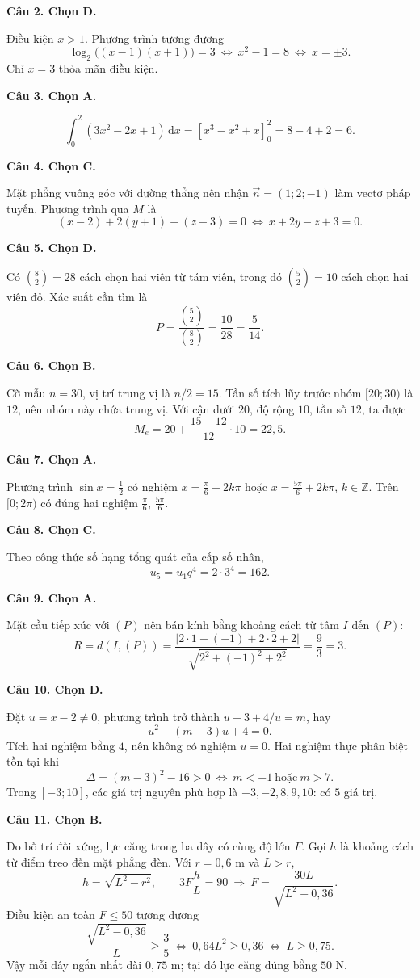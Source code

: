 \documentclass[12pt,a4paper]{article}
\newcommand{\loigiai}[1]{\par\medskip\Needspace{4\baselineskip}\noindent\textbf{#1}\par\nobreak}
\begin{document}
\loigiai{Câu 2. Chọn D.}
Điều kiện $x>1$. Phương trình tương đương
\[
\log_2\big((x-1)(x+1)\big)=3
\ \Longleftrightarrow\ x^2-1=8
\ \Longleftrightarrow\ x=\pm3.
\]
Chỉ $x=3$ thỏa mãn điều kiện.

\loigiai{Câu 3. Chọn A.}
\[
\int_0^2(3x^2-2x+1)\,\mathrm dx
=\left[x^3-x^2+x\right]_0^2=8-4+2=6.
\]

\loigiai{Câu 4. Chọn C.}
Mặt phẳng vuông góc với đường thẳng nên nhận $\vec n=(1;2;-1)$ làm vectơ pháp tuyến. Phương trình qua $M$ là
\[
(x-2)+2(y+1)-(z-3)=0
\ \Longleftrightarrow\ x+2y-z+3=0.
\]

\loigiai{Câu 5. Chọn D.}
Có $\binom82=28$ cách chọn hai viên từ tám viên, trong đó $\binom52=10$ cách chọn hai viên đỏ. Xác suất cần tìm là
\[
P=\frac{\binom52}{\binom82}=\frac{10}{28}=\frac5{14}.
\]

\loigiai{Câu 6. Chọn B.}
Cỡ mẫu $n=30$, vị trí trung vị là $n/2=15$. Tần số tích lũy trước nhóm $[20;30)$ là $12$, nên nhóm này chứa trung vị. Với cận dưới $20$, độ rộng $10$, tần số $12$, ta được
\[
M_e=20+\frac{15-12}{12}\cdot10=22{,}5.
\]

\loigiai{Câu 7. Chọn A.}
Phương trình $\sin x=\tfrac12$ có nghiệm $x=\tfrac\pi6+2k\pi$ hoặc $x=\tfrac{5\pi}6+2k\pi$, $k\in\mathbb Z$. Trên $[0;2\pi)$ có đúng hai nghiệm $\tfrac\pi6$, $\tfrac{5\pi}6$.

\loigiai{Câu 8. Chọn C.}
Theo công thức số hạng tổng quát của cấp số nhân,
\[
u_5=u_1q^4=2\cdot3^4=162.
\]

\loigiai{Câu 9. Chọn A.}
Mặt cầu tiếp xúc với $(P)$ nên bán kính bằng khoảng cách từ tâm $I$ đến $(P)$:
\[
R=d(I,(P))=\frac{|2\cdot1-(-1)+2\cdot2+2|}{\sqrt{2^2+(-1)^2+2^2}}=\frac93=3.
\]

\loigiai{Câu 10. Chọn D.}
Đặt $u=x-2\ne0$, phương trình trở thành $u+3+4/u=m$, hay
\[
u^2-(m-3)u+4=0.
\]
Tích hai nghiệm bằng $4$, nên không có nghiệm $u=0$. Hai nghiệm thực phân biệt tồn tại khi
\[
\Delta=(m-3)^2-16>0
\ \Longleftrightarrow\ m<-1\ \text{hoặc}\ m>7.
\]
Trong $[-3;10]$, các giá trị nguyên phù hợp là $-3,-2,8,9,10$: có $5$ giá trị.

\loigiai{Câu 11. Chọn B.}
Do bố trí đối xứng, lực căng trong ba dây có cùng độ lớn $F$. Gọi $h$ là khoảng cách từ điểm treo đến mặt phẳng đèn. Với $r=0{,}6$ m và $L>r$,
\[
h=\sqrt{L^2-r^2},\qquad 3F\frac{h}{L}=90
\ \Longrightarrow\ F=\frac{30L}{\sqrt{L^2-0{,}36}}.
\]
Điều kiện an toàn $F\leq50$ tương đương
\[
\frac{\sqrt{L^2-0{,}36}}L\geq\frac35
\ \Longleftrightarrow\ 0{,}64L^2\geq0{,}36
\ \Longleftrightarrow\ L\geq0{,}75.
\]
Vậy mỗi dây ngắn nhất dài $0{,}75$ m; tại đó lực căng đúng bằng $50$ N.
\end{document}
